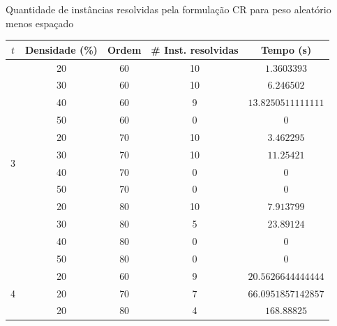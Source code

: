 \documentclass[dvipsnames]{beamer}
\begin{document}
\begin{frame}{Quantidade de instâncias resolvidas pela formulação CR para peso aleatório menos espaçado}
\begin{center}
\noindent
\footnotesize{
\begin{tabular}{|c|c|c|c|c|}\hline
{$t$} & {Densidade (\%)} & {Ordem} & {\# Inst. resolvidas} & {Tempo (s)}
\\ \hline\hline
\multirow{12}{*}{3}	&	20	&	60	&	10	&	$\num{1,3603393}$	\\
	&	30	&	60	&	10	&	$\num{6,246502}$	\\
	&	40	&	60	&	9	&	$\num{13,8250511111111}$	\\
	&	50	&	60	&	0	&	0	\\
	&	20	&	70	&	10	&	$\num{3,462295}$	\\
	&	30	&	70	&	10	&	$\num{11,25421}$	\\
	&	40	&	70	&	0	&	0	\\
	&	50	&	70	&	0	&	0	\\
	&	20	&	80	&	10	&	$\num{7,913799}$	\\
	&	30	&	80	&	5	&	$\num{23,89124}$	\\
	&	40	&	80	&	0	&	0	\\
&	50	&	80	&	0	&	0	\\
\hline
\multirow{3}{*}{4}	&	20	&	60	&	9	&	$\num{20,5626644444444}$	\\
	&	20	&	70	&	7	&	$\num{66,0951857142857}$	\\
	&	20	&	80	&	4	&	$\num{168,88825}$	\\
\hline\hline
\end{tabular}
}
\end{center}  
 \end{frame}
\end{document}
